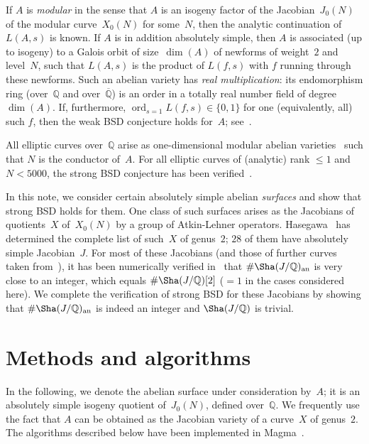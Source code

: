 \documentclass{amsart}
\newcommand{\Q}{{\mathbb{Q}}}
\newcommand{\Qbar}{{\overline{\Q}}}
\newcommand{\an}{{\mathrm{an}}}
\newcommand{\ord}{\operatorname{ord}}
\begin{document}
	If $A$ is \emph{modular} in the sense that $A$ is an isogeny factor
	of the Jacobian~$J_0(N)$ of the modular curve~$X_0(N)$ for some~$N$,
	then the analytic continuation of~$L(A,s)$ is known. If $A$ is in addition
	absolutely simple, then $A$ is associated (up to isogeny) to a Galois orbit
	of size~$\dim(A)$ of newforms of weight~$2$ and level~$N$, such that
	$L(A, s)$ is the product of $L(f, s)$ with $f$ running through these newforms.
	Such an abelian variety has \emph{real multiplication}: its endomorphism
	ring (over~$\Q$ and over~$\Qbar$) is an order in a totally real
	number field of degree~$\dim(A)$. If, furthermore,
	$\ord_{s=1} L(f,s) \in \{0,1\}$ for one (equivalently, all) such $f$,
	then the weak BSD conjecture holds for~$A$; see~\cite{KolyvaginLogachev}.
	
	All elliptic curves over~$\Q$ arise as one-dimensional modular abelian
	varieties~\cite{Wiles1995,TaylorWiles1995,BCDT2001} such that $N$ is the conductor
	of~$A$. For all elliptic curves of (analytic) rank $\le 1$ and $N < 5000$,
	the strong BSD conjecture has been verified~\cite{GJPST,MillerStoll2013,CreutzMiller2012}.
	
	In this note, we consider certain absolutely simple abelian \emph{surfaces}
	and show that strong BSD holds for them. One class of such surfaces arises
	as the Jacobians of quotients~$X$ of~$X_0(N)$ by a group of Atkin-Lehner
	operators. Hasegawa~\cite{Hasegawa1995} has determined the complete
	list of such~$X$ of genus~$2$; $28$ of them have absolutely simple
	Jacobian~$J$. For most of these Jacobians (and those of further curves taken
	from~\cite{Wang1995}), it has been numerically verified
	in~\cite{FLSSSW,vanBommel2019} that $\#\Sha(J/\Q)_{\an}$ is very close to
	an integer,
	which equals $\#\Sha(J/\Q)[2]$ ($= 1$ in the cases
	considered here). We complete the verification of strong BSD for
	these Jacobians by showing that $\#\Sha(J/\Q)_{\an}$ is indeed an integer
	and $\Sha(J/\Q)$ is trivial.
	
	\section{Methods and algorithms} \label{S:algo}
	
	In the following, we denote the abelian surface under consideration by~$A$;
	it is an absolutely simple isogeny quotient of~$J_0(N)$, defined over~$\Q$.
	We frequently use the fact that $A$ can be obtained as the Jacobian variety
	of a curve~$X$ of genus~$2$. The algorithms described below have been
	implemented in Magma~\cite{Magma}.
	
\end{document}

